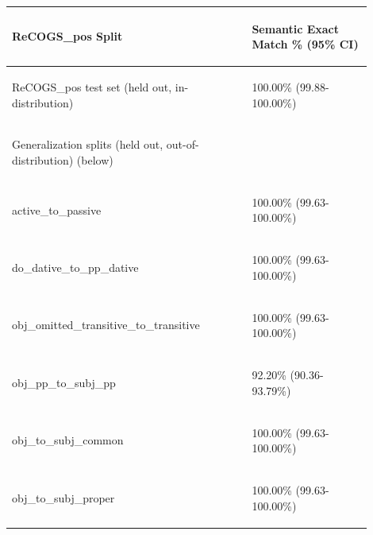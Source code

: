 \documentclass[11pt]{article}
\begin{document}
\begin{table}
\centering
\begin{tabular}{p{0.6\linewidth} p{0.3\linewidth}}
\hline
\begin{tiny}\textbf{ReCOGS\_pos Split}\end{tiny} & \begin{tiny}\textbf{Semantic Exact Match \% (95\% CI)}\end{tiny} \\
\hline
\begin{tiny}ReCOGS\_pos test set (held out, in-distribution)\end{tiny} & \begin{tiny} 100.00\% (99.88-100.00\%)\end{tiny} \\
\hline
\begin{tiny}Generalization splits (held out, out-of-distribution) (below)\end{tiny} & \\
\hline
\begin{tiny}active\_to\_passive\end{tiny} & \begin{tiny}100.00\% (99.63-100.00\%)\end{tiny} \\
\begin{tiny}do\_dative\_to\_pp\_dative\end{tiny} & \begin{tiny} 100.00\% (99.63-100.00\%)\end{tiny} \\
\begin{tiny}obj\_omitted\_transitive\_to\_transitive\end{tiny} & \begin{tiny} 100.00\% (99.63-100.00\%)\end{tiny} \\
\begin{tiny}obj\_pp\_to\_subj\_pp\end{tiny} & \begin{tiny} 92.20\% (90.36-93.79\%)\end{tiny} \\
\begin{tiny}obj\_to\_subj\_common\end{tiny} & \begin{tiny} 100.00\% (99.63-100.00\%)\end{tiny} \\
\begin{tiny}obj\_to\_subj\_proper\end{tiny} & \begin{tiny} 100.00\% (99.63-100.00\%)\end{tiny} \\

\end{tabular}
\end{table}
\end{document}
